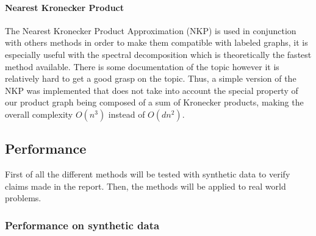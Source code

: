 \documentclass{article}
\theoremstyle{definition}
\begin{document}
\paragraph{Nearest Kronecker Product}
The Nearest Kronecker Product Approximation (NKP)\cite{van1993approximation} is used in conjunction with others methods in order to make them compatible with labeled graphs, it is especially useful with the spectral decomposition which is theoretically the fastest method available. There is some documentation of the topic however it is relatively hard to get a good grasp on the topic. Thus, a simple version of the NKP was implemented that does not take into account the special property of our product graph being composed of a sum of Kronecker products, making the overall complexity $O(n^3)$ instead of $O(dn^2)$.
	

\subsection{Performance}
First of all the different methods will be tested with synthetic data to verify claims made in the report. Then, the methods will be applied to real world problems. 
\subsubsection{Performance on synthetic data}
\end{document}
